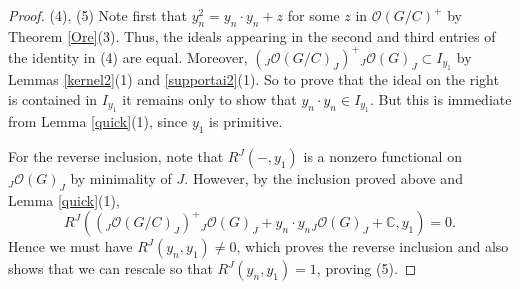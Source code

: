 \documentclass{amsart}
\numberwithin{equation}{section}
\theoremstyle{definition}
\begin{document}
\begin{proof}
(4), (5) Note first that $y_{n}^2=y_{n}\cdot y_{n}+z$ for some $z$ in $\mathcal{O}(G/C )^+$ by Theorem \ref{Ore}(3). Thus, the ideals appearing in the second and third entries of the identity in (4) are equal. Moreover, $ ({}_J\mathcal{O}(G/C)_J)^+{}_J\mathcal{O}(G)_J \subset I_{y_1}$ by Lemmas \ref{kernel2}(1) and \ref{supportai2}(1). So to prove that the ideal on the right is contained in $I_{y_1}$ it remains only to show that $y_n\cdot y_n \in I_{y_1}$. But this is immediate from Lemma \ref{quick}(1), since $y_1$ is primitive.

For the reverse inclusion, note that $R^J(-,y_1)$ is a nonzero functional on ${}_J\mathcal{O}(G)_J$ by minimality of $J$. However, by the inclusion proved above and Lemma \ref{quick}(1),
$$ R^J\left(\left({}_J\mathcal{O}(G/C)_J\right)^+{}_J\mathcal{O}(G)_J + y_n\cdot y_n {}_J\mathcal{O}(G)_J + \mathbb{C}, y_1\right) = 0.$$
Hence we must have $R^J(y_n,y_1) \neq 0$, which proves the reverse inclusion and also shows that we can rescale so that $R^J(y_n,y_1) = 1$, proving (5).
\end{proof}
\end{document}
